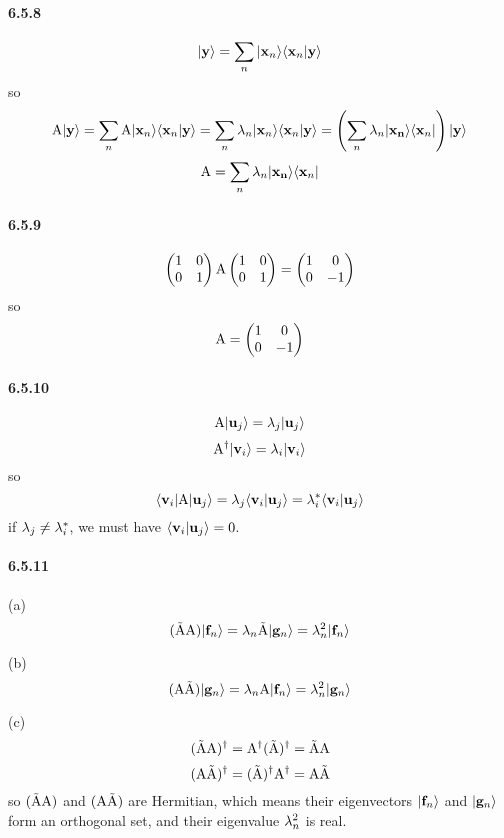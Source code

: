 \documentclass[a4paper]{article}
\begin{document}
\paragraph{6.5.8}
\[
|\mathbf{y}\rangle=\sum_n|\mathbf{x}_n\rangle\langle\mathbf{x}_n|\mathbf{y}\rangle
\]
so
\[
\mathrm{A}|\mathbf{y}\rangle=\sum_n\mathrm{A}|\mathbf{x}_n\rangle\langle\mathbf{x}_n|\mathbf{y}\rangle=\sum_n\lambda_n|\mathbf{x}_n\rangle\langle\mathbf{x}_n|\mathbf{y}\rangle=\left(\sum_n\lambda_n|\mathbf{x_n}\rangle\langle\mathbf{x}_n|\right)|\mathbf{y}\rangle
\]
\[
\mathrm{A}=\sum_n\lambda_n|\mathbf{x_n}\rangle\langle\mathbf{x}_n|
\]

\paragraph{6.5.9}
\[
\begin{pmatrix}
1&0\\0&1
\end{pmatrix}
\mathrm{A}
\begin{pmatrix}
1&0\\0&1
\end{pmatrix}=
\begin{pmatrix}
1&0\\0&-1
\end{pmatrix}
\]
so
\[
\mathrm{A}=\begin{pmatrix}
1&0\\0&-1
\end{pmatrix}
\]

\paragraph{6.5.10}
\[
\mathrm{A}|\mathbf{u}_j\rangle=\lambda_j|\mathbf{u}_j\rangle
\]
\[
\mathrm{A}^\dagger|\mathbf{v}_i\rangle=\lambda_i|\mathbf{v}_i\rangle
\]
so
\[
\langle\mathbf{v}_i|\mathrm{A}|\mathbf{u}_j\rangle=\lambda_j\langle\mathbf{v}_i|\mathbf{u}_j\rangle=\lambda_i^*\langle\mathbf{v}_i|\mathbf{u}_j\rangle
\]
if $\lambda_j\neq\lambda_i^*$, we must have $\langle\mathbf{v}_i|\mathbf{u}_j\rangle=0$.

\paragraph{6.5.11}
(a) 
\[
(\tilde{\mathrm{A}}\mathrm{A})|\mathbf{f}_n\rangle=\lambda_n\tilde{\mathrm{A}}|\mathbf{g}_n\rangle=\lambda_n^2|\mathbf{f}_n\rangle
\]

(b)
\[
(\mathrm{A}\tilde{\mathrm{A}})|\mathbf{g}_n\rangle=\lambda_n\mathrm{A}|\mathbf{f}_n\rangle=\lambda_n^2|\mathbf{g}_n\rangle
\]

(c)
\[
(\tilde{\mathrm{A}}\mathrm{A})^\dagger=\mathrm{A}^\dagger(\tilde{\mathrm{A}})^\dagger=\tilde{\mathrm{A}}\mathrm{A}
\]
\[
(\mathrm{A}\tilde{\mathrm{A}})^\dagger=(\tilde{\mathrm{A}})^\dagger\mathrm{A}^\dagger=\mathrm{A}\tilde{\mathrm{A}}
\]
so $(\tilde{\mathrm{A}}\mathrm{A})$ and $(\mathrm{A}\tilde{\mathrm{A}})$ are Hermitian, which means their eigenvectors $|\mathbf{f}_n\rangle$ and $|\mathbf{g}_n\rangle$ form an orthogonal set, and their eigenvalue $\lambda_n^2$ is real.
\end{document}

